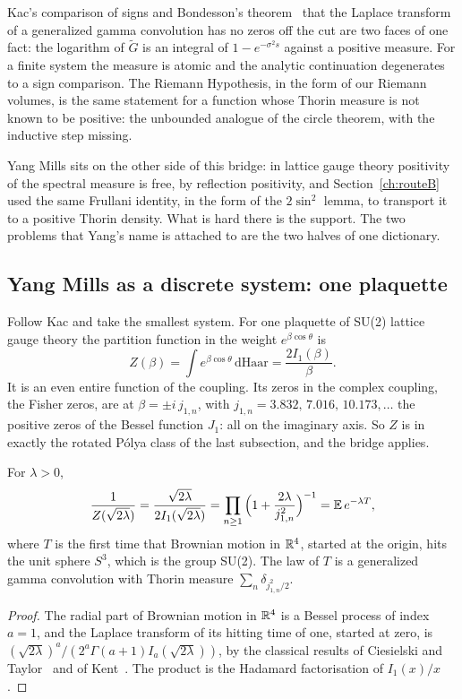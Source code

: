 Kac's comparison of signs and Bondesson's theorem~\cite{Bo92} that the Laplace transform of a generalized gamma convolution has no zeros off the cut are two faces of one fact: the logarithm of $\tilde G$ is an integral of $1-e^{-\sigma^2s}$ against a positive measure. For a finite system the measure is atomic and the analytic continuation degenerates to a sign comparison. The Riemann Hypothesis, in the form of our Riemann volumes, is the same statement for a function whose Thorin measure is not known to be positive: the unbounded analogue of the circle theorem, with the inductive step missing.

Yang Mills sits on the other side of this bridge: in lattice gauge theory positivity of the spectral measure is free, by reflection positivity, and Section~\ref{ch:routeB} used the same Frullani identity, in the form of the $2\sin^2$ lemma, to transport it to a positive Thorin density. What is hard there is the support. The two problems that Yang's name is attached to are the two halves of one dictionary.

\subsection{Yang Mills as a discrete system: one plaquette}

Follow Kac and take the smallest system. For one plaquette of SU(2) lattice gauge theory the partition function in the weight $e^{\beta\cos\theta}$ is
\[
Z(\beta)=\int e^{\beta\cos\theta}\,\mathrm d\mathrm{Haar}=\frac{2I_1(\beta)}{\beta}.
\]
It is an even entire function of the coupling. Its zeros in the complex coupling, the Fisher zeros, are at $\beta=\pm i\,j_{1,n}$, with $j_{1,n}=3.832,\,7.016,\,10.173,\dots$ the positive zeros of the Bessel function $J_1$: all on the imaginary axis. So $Z$ is in exactly the rotated P\'olya class of the last subsection, and the bridge applies.

\begin{proposition}\label{prop:hitting}
For $\lambda>0$,
\[
\frac{1}{Z(\sqrt{2\lambda})}=\frac{\sqrt{2\lambda}}{2I_1(\sqrt{2\lambda})}=\prod_{n\ge1}\Big(1+\frac{2\lambda}{j_{1,n}^2}\Big)^{-1}=\mathbb{E}\,e^{-\lambda T},
\]
where $T$ is the first time that Brownian motion in $\mathbb{R}^4$, started at the origin, hits the unit sphere $S^3$, which is the group SU(2). The law of $T$ is a generalized gamma convolution with Thorin measure $\sum_n\delta_{j_{1,n}^2/2}$.
\end{proposition}

\begin{proof}
The radial part of Brownian motion in $\mathbb{R}^4$ is a Bessel process of index $a=1$, and the Laplace transform of its hitting time of one, started at zero, is $(\sqrt{2\lambda})^a/(2^a\Gamma(a+1)I_a(\sqrt{2\lambda}))$, by the classical results of Ciesielski and Taylor~\cite{CT62} and of Kent~\cite{Ke78}. The product is the Hadamard factorisation of $I_1(x)/x$.
\end{proof}

